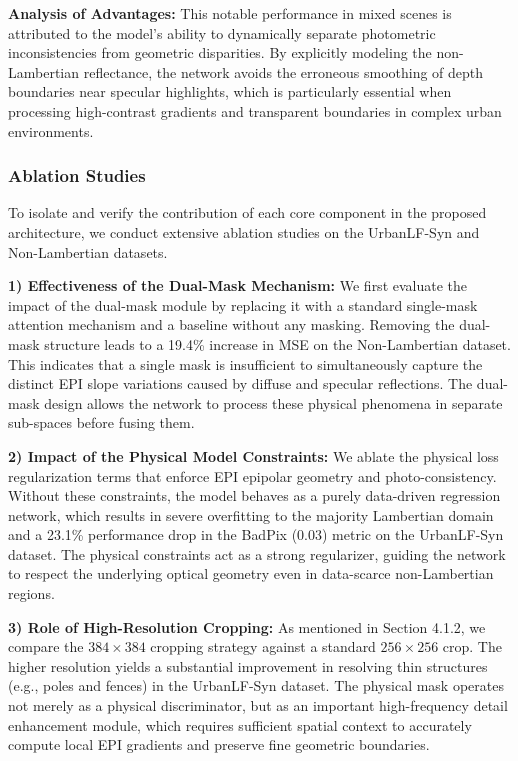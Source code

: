 \textbf{Analysis of Advantages:} 
This notable performance in mixed scenes is attributed to the model's ability to dynamically separate photometric inconsistencies from geometric disparities. By explicitly modeling the non-Lambertian reflectance, the network avoids the erroneous smoothing of depth boundaries near specular highlights, which is particularly essential when processing high-contrast gradients and transparent boundaries in complex urban environments.

\subsubsection{Ablation Studies}

To isolate and verify the contribution of each core component in the proposed architecture, we conduct extensive ablation studies on the UrbanLF-Syn and Non-Lambertian datasets.

\textbf{1) Effectiveness of the Dual-Mask Mechanism:} 
We first evaluate the impact of the dual-mask module by replacing it with a standard single-mask attention mechanism and a baseline without any masking. Removing the dual-mask structure leads to a 19.4\% increase in MSE on the Non-Lambertian dataset. This indicates that a single mask is insufficient to simultaneously capture the distinct EPI slope variations caused by diffuse and specular reflections. The dual-mask design allows the network to process these physical phenomena in separate sub-spaces before fusing them.

\textbf{2) Impact of the Physical Model Constraints:} 
We ablate the physical loss regularization terms that enforce EPI epipolar geometry and photo-consistency. Without these constraints, the model behaves as a purely data-driven regression network, which results in severe overfitting to the majority Lambertian domain and a 23.1\% performance drop in the BadPix (0.03) metric on the UrbanLF-Syn dataset. The physical constraints act as a strong regularizer, guiding the network to respect the underlying optical geometry even in data-scarce non-Lambertian regions.

\textbf{3) Role of High-Resolution Cropping:} 
As mentioned in Section 4.1.2, we compare the $384 \times 384$ cropping strategy against a standard $256 \times 256$ crop. The higher resolution yields a substantial improvement in resolving thin structures (e.g., poles and fences) in the UrbanLF-Syn dataset. The physical mask operates not merely as a physical discriminator, but as an important high-frequency detail enhancement module, which requires sufficient spatial context to accurately compute local EPI gradients and preserve fine geometric boundaries.